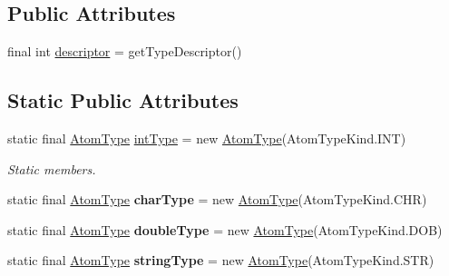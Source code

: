 \subsection*{Public Attributes}
\begin{DoxyCompactItemize}
\item 
final int \hyperlink{classcompiler_1_1seman_1_1type_1_1_type_afb6b8315f74dcf7fa95df4b4e6fca2e9}{descriptor} = get\+Type\+Descriptor()
\end{DoxyCompactItemize}
\subsection*{Static Public Attributes}
\begin{DoxyCompactItemize}
\item 
\mbox{\label{classcompiler_1_1seman_1_1type_1_1_type_a2f51c2f983463c6c85b973a16a3fb81d}} 
static final \hyperlink{classcompiler_1_1seman_1_1type_1_1_atom_type}{Atom\+Type} \hyperlink{classcompiler_1_1seman_1_1type_1_1_type_a2f51c2f983463c6c85b973a16a3fb81d}{int\+Type} = new \hyperlink{classcompiler_1_1seman_1_1type_1_1_atom_type}{Atom\+Type}(Atom\+Type\+Kind.\+I\+NT)
\begin{DoxyCompactList}\small\item\em Static members. \end{DoxyCompactList}\item 
\mbox{\label{classcompiler_1_1seman_1_1type_1_1_type_a3d399f77b2003baad36d1de2763f77b0}} 
static final \hyperlink{classcompiler_1_1seman_1_1type_1_1_atom_type}{Atom\+Type} {\bfseries char\+Type} = new \hyperlink{classcompiler_1_1seman_1_1type_1_1_atom_type}{Atom\+Type}(Atom\+Type\+Kind.\+C\+HR)
\item 
\mbox{\label{classcompiler_1_1seman_1_1type_1_1_type_a2938d41a6262850cdd052f7dc78afec0}} 
static final \hyperlink{classcompiler_1_1seman_1_1type_1_1_atom_type}{Atom\+Type} {\bfseries double\+Type} = new \hyperlink{classcompiler_1_1seman_1_1type_1_1_atom_type}{Atom\+Type}(Atom\+Type\+Kind.\+D\+OB)
\item 
\mbox{\label{classcompiler_1_1seman_1_1type_1_1_type_a59c6cde7e4e929230d6117ca8612f7ca}} 
static final \hyperlink{classcompiler_1_1seman_1_1type_1_1_atom_type}{Atom\+Type} {\bfseries string\+Type} = new \hyperlink{classcompiler_1_1seman_1_1type_1_1_atom_type}{Atom\+Type}(Atom\+Type\+Kind.\+S\+TR)

\end{DoxyCompactItemize}
